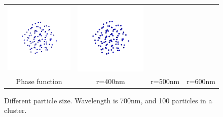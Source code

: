 \begin{figure}
\begin{tabular}{cccc}
        \includegraphics[width=\resLen]{images/particle/validate3_D2_N100_500nm.png} &
        \includegraphics[width=\resLen]{images/particle/validate7_D2_N100_600nm.png} 
        \\ 
        Phase function & r=400nm & r=500nm & r=600nm
    \end{tabular}
    \caption{\label{fig:paritclesize}
        Different particle size. Wavelength is 700nm, and 100 particles in a cluster.
    }
\end{figure}

